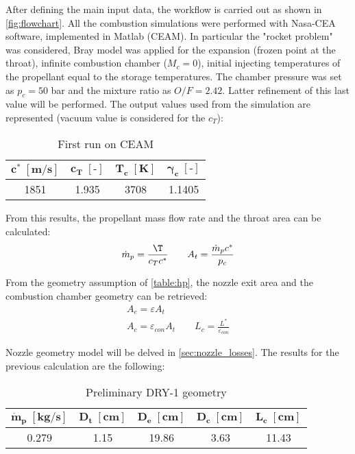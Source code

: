 After defining the main input data, the workflow is carried out as shown in \autoref{fig:flowchart}. All the combustion simulations were performed with Nasa-CEA software, implemented in Matlab (CEAM). In particular the "rocket problem" was considered, Bray model was applied for the expansion (frozen point at the throat), infinite combustion chamber ($M_c = 0$), initial injecting temperatures of the propellant equal to the storage temperatures. The chamber pressure was set as $p_c = 50$ bar and the mixture ratio as $O/F = 2.42$. Latter refinement of this last value will be performed. The output values used from the simulation are represented (vacuum value is considered for the $c_T$):
\begin{table}[H]
    \renewcommand{\arraystretch}{1.2}
    \centering
    \begin{tabular}{|c|c|c|c|}
        \hline
        $\boldsymbol{c^* \; [\textbf{m/s}]}$ & $\boldsymbol{c_T \; [\textbf{-}]}$ & $\boldsymbol{T_c \; [\textbf{K}]}$ & $\boldsymbol{\gamma_c \; [\textbf{-}]}$ \\
        \hline
        \hline
        1851 & 1.935 & 3708 & 1.1405 \\
        \hline
    \end{tabular}
    \caption{First run on CEAM}
    \label{table:out_CEA_1}
\end{table}

From this results, the propellant mass flow rate and the throat area can be calculated:
\begin{equation}
    \dot{m}_p = \frac{\T}{c_T c^*} 
    \qquad 
    A_t = \frac{\dot{m}_p c^*}{p_c}
\end{equation}

From the geometry assumption of \autoref{table:hp}, the nozzle exit area and the combustion chamber geometry can be retrieved:
\begin{gather}
    A_e = \varepsilon A_t
    \\
    A_c = \varepsilon_{con} A_t \qquad L_c = \frac{L^*}{\varepsilon_{con}}
\end{gather}

Nozzle geometry model will be delved in \autoref{sec:nozzle_losses}. The results for the previous calculation are the following:

\begin{table}[H]
    \renewcommand{\arraystretch}{1.2}
    \centering
    \begin{tabular}{|c|c|c|c|c|}
        \hline
        $\boldsymbol{\dot{m}_p \; [\textbf{kg/s}]}$ & $\boldsymbol{D_t \; [\textbf{cm}]}$ & $\boldsymbol{D_e \; [\textbf{cm}]}$  & $\boldsymbol{D_{c} \; [\textbf{cm}]}$ & $\boldsymbol{L_c \; [\textbf{cm}]}$ \\
        \hline
        \hline
        0.279 & 1.15 & 19.86 & 3.63 & 11.43 \\
        \hline
    \end{tabular}
    \caption{Preliminary DRY-1 geometry}
    \label{table:preliminary_dry}
\end{table}


